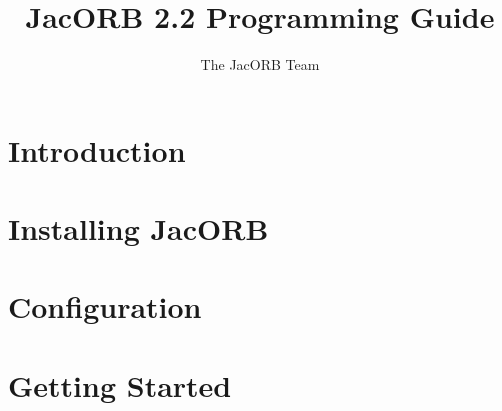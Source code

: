 \documentclass[12pt]{scrbook}
\title{JacORB 2.2 Programming Guide}
\author{The JacORB Team}
\begin{document}
\newcommand{\cmdline}[1]{\begin{small}\noindent \texttt{\$ #1}\end{small}}

\newcommand{\JacORBDir}{JacORB2\_2}
\newcommand{\JacORBVersion}{2.2}
\maketitle

\setlength{\parskip}{1.1ex}
\newpage
\tableofcontents


\chapter{Introduction}
\label{ch:intro}




\chapter{Installing JacORB}
\label{ch:installing}




\chapter{Configuration}
\label{ch:configuration}




\chapter{Getting Started}
\label{ch:start}



\end{document}
